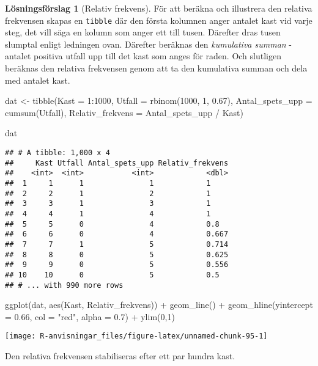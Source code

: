 \documentclass[
]{book}
\newenvironment{Shaded}{\begin{snugshade}}{\end{snugshade}}
\newcommand{\AttributeTok}[1]{\textcolor[rgb]{0.77,0.63,0.00}{#1}}
\newcommand{\DecValTok}[1]{\textcolor[rgb]{0.00,0.00,0.81}{#1}}
\newcommand{\FloatTok}[1]{\textcolor[rgb]{0.00,0.00,0.81}{#1}}
\newcommand{\FunctionTok}[1]{\textcolor[rgb]{0.00,0.00,0.00}{#1}}
\newcommand{\NormalTok}[1]{#1}
\newcommand{\OtherTok}[1]{\textcolor[rgb]{0.56,0.35,0.01}{#1}}
\newcommand{\SpecialCharTok}[1]{\textcolor[rgb]{0.00,0.00,0.00}{#1}}
\newcommand{\StringTok}[1]{\textcolor[rgb]{0.31,0.60,0.02}{#1}}
\theoremstyle{definition}
\theoremstyle{definition}
\theoremstyle{definition}
\theoremstyle{definition}
\newtheorem{hypothesis}{Lösningsförslag}[chapter]
\theoremstyle{remark}
\begin{document}
\begin{hypothesis}[Relativ frekvens]
För att beräkna och illustrera den relativa frekvensen skapas en \texttt{tibble} där den första kolumnen anger antalet kast vid varje steg, det vill säga en kolumn som anger ett till tusen. Därefter dras tusen slumptal enligt ledningen ovan. Därefter beräknas den \emph{kumulativa summan} - antalet positiva utfall upp till det kast som anges för raden. Och slutligen beräknas den relativa frekvensen genom att ta den kumulativa summan och dela med antalet kast.

\begin{Shaded}
\begin{Highlighting}[]
\NormalTok{dat }\OtherTok{\textless{}{-}} \FunctionTok{tibble}\NormalTok{(}\AttributeTok{Kast =} \DecValTok{1}\SpecialCharTok{:}\DecValTok{1000}\NormalTok{,}
              \AttributeTok{Utfall =} \FunctionTok{rbinom}\NormalTok{(}\DecValTok{1000}\NormalTok{, }\DecValTok{1}\NormalTok{, }\FloatTok{0.67}\NormalTok{),}
              \AttributeTok{Antal\_spets\_upp =} \FunctionTok{cumsum}\NormalTok{(Utfall),}
              \AttributeTok{Relativ\_frekvens =}\NormalTok{ Antal\_spets\_upp }\SpecialCharTok{/}\NormalTok{ Kast)}

\NormalTok{dat}
\end{Highlighting}
\end{Shaded}

\begin{verbatim}
## # A tibble: 1,000 x 4
##     Kast Utfall Antal_spets_upp Relativ_frekvens
##    <int>  <int>           <int>            <dbl>
##  1     1      1               1            1    
##  2     2      1               2            1    
##  3     3      1               3            1    
##  4     4      1               4            1    
##  5     5      0               4            0.8  
##  6     6      0               4            0.667
##  7     7      1               5            0.714
##  8     8      0               5            0.625
##  9     9      0               5            0.556
## 10    10      0               5            0.5  
## # ... with 990 more rows
\end{verbatim}

\begin{Shaded}
\begin{Highlighting}[]
\FunctionTok{ggplot}\NormalTok{(dat, }\FunctionTok{aes}\NormalTok{(Kast, Relativ\_frekvens)) }\SpecialCharTok{+}
  \FunctionTok{geom\_line}\NormalTok{() }\SpecialCharTok{+}
  \FunctionTok{geom\_hline}\NormalTok{(}\AttributeTok{yintercept =} \FloatTok{0.66}\NormalTok{, }\AttributeTok{col =} \StringTok{"red"}\NormalTok{, }\AttributeTok{alpha =} \FloatTok{0.7}\NormalTok{) }\SpecialCharTok{+}
  \FunctionTok{ylim}\NormalTok{(}\DecValTok{0}\NormalTok{,}\DecValTok{1}\NormalTok{)}
\end{Highlighting}
\end{Shaded}

\begin{center}\texttt{[image: R-anvisningar\_files/figure-latex/unnamed-chunk-95-1]} \end{center}

Den relativa frekvensen stabiliseras efter ett par hundra kast.
\end{hypothesis}
\end{document}
